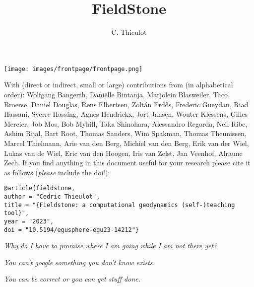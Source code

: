 \documentclass[a4paper,12pt]{report}
\title{FieldStone}
\author{C. Thieulot}
\begin{document}
\thispagestyle{empty}
\texttt{[image: images/frontpage/frontpage.png]}

{\scriptsize With (direct or indirect, small or large) contributions 
from (in alphabetical order): 
Wolfgang Bangerth, 
Dani\"elle Bintanja,
Marjolein Blasweiler,
Taco Broerse,
Daniel Douglas,
Rens Elbertsen,
Zolt{\'a}n Erd{\H{o}}s, 
Frederic Gueydan,
Riad Hassani,
Sverre Hassing,
Agnes Hendrickx,
Jort Jansen,
Wouter Klessens,
Gilles Mercier,
Job Mos, 
Bob Myhill,
Taka Shinohara, 
Alessandro Regorda,
Neil Ribe,
Ashim Rijal,
Bart Root,
Thomas Sanders,
Wim Spakman,
Thomas Theunissen,
Marcel Thielmann,
Arie van den Berg,
Michiel van den Berg,
Erik van der Wiel, 
Lukas van de Wiel, 
Eric van den Hoogen, 
Iris van Zelst,
Jan Veenhof,
Alraune Zech.}
\newpage
If you find anything in this document useful for your research please cite it 
as follows ({\it please} include the doi!):

\begin{verbatim}
@article{fieldstone,
author = "Cedric Thieulot",
title = "{Fieldstone: a computational geodynamics (self-)teaching tool}",
year = "2023",
doi = "10.5194/egusphere-egu23-14212"}
\end{verbatim}

\vspace{7cm}

\begin{center}
{\sl Why do I have to promise where I am going while I am not there yet?}

\vspace{1cm}

{\sl You can't google something you don't know exists.}

\vspace{1cm}

{\sl You can be correct or you can get stuff done.}
\end{center}

\clearpage
\tableofcontents

\end{document}
